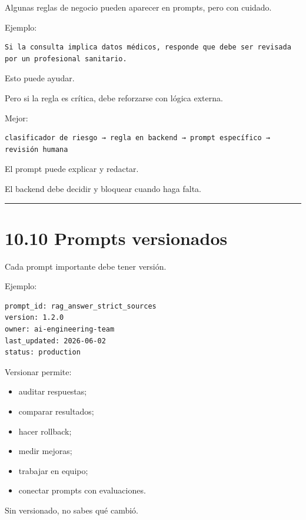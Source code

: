 Algunas reglas de negocio pueden aparecer en prompts, pero con cuidado.

Ejemplo:

\begin{lstlisting}
Si la consulta implica datos médicos, responde que debe ser revisada por un profesional sanitario.
\end{lstlisting}

Esto puede ayudar.

Pero si la regla es crítica, debe reforzarse con lógica externa.

Mejor:

\begin{lstlisting}
clasificador de riesgo → regla en backend → prompt específico → revisión humana
\end{lstlisting}

El prompt puede explicar y redactar.

El backend debe decidir y bloquear cuando haga falta.

\begin{center}\rule{0.5\linewidth}{0.5pt}\end{center}

\section{10.10 Prompts versionados}\label{prompts-versionados-1}

Cada prompt importante debe tener versión.

Ejemplo:

\begin{lstlisting}
prompt_id: rag_answer_strict_sources
version: 1.2.0
owner: ai-engineering-team
last_updated: 2026-06-02
status: production
\end{lstlisting}

Versionar permite:

\begin{itemize}
\tightlist
\item
  auditar respuestas;
\item
  comparar resultados;
\item
  hacer rollback;
\item
  medir mejoras;
\item
  trabajar en equipo;
\item
  conectar prompts con evaluaciones.
\end{itemize}

Sin versionado, no sabes qué cambió.

